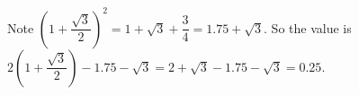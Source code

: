 Note $\left(1+\dfrac{\sqrt3}2\right)^2=1+\sqrt3+\dfrac34=1.75+\sqrt3$. So the value is $2\left(1+\dfrac{\sqrt3}2\right)-1.75-\sqrt3=2+\sqrt3-1.75-\sqrt3=\boxed{0.25}$.
